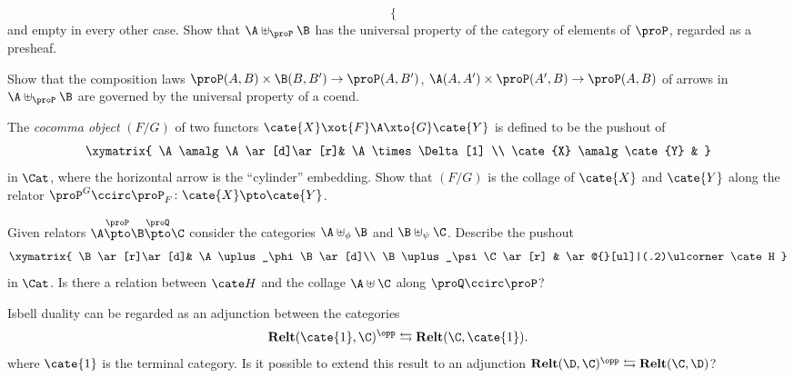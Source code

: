 \begin{exerciseset}
\begin{exercisepoints}
\[\begin{cases}
\end{cases}
\]
and empty in every other case. Show that $\A\uplus_\proP \B$ has the universal property of the category of elements of $\proP$, regarded as a presheaf.
\item Show that the composition laws $\proP(A,B)\times \B(B,B')\to \proP(A,B')$, $\A(A,A')\times \proP(A',B)\to \proP(A, B)$ of arrows in $\A\uplus_\proP \B$ are governed by the universal property of a coend.
\item The \emph{cocomma object} $(F/G)$ of two functors $\cate{X} \xot{F} \A \xto{G} \cate{Y}$ is defined to be the pushout of
\[
\xymatrix{
	\A \amalg \A \ar[d]\ar[r]& \A \times \Delta[1] \\
	\cate{X} \amalg \cate{Y} & 
}
\]
in $\Cat$, where the horizontal arrow is the ``cylinder'' embedding. Show that $(F/G)$ is the collage of $\cate{X}$ and $\cate{Y}$ along the relator $\proP^G \ccirc \proP_F \colon \cate{X} \pto \cate{Y}$.
\item Given relators $\A \overset{\proP}\pto \B \overset{\proQ}\pto \C$ consider the categories $\A\uplus_\phi\B$ and $\B\uplus_\psi\C$. Describe the pushout
\[
\xymatrix{
\B \ar[r]\ar[d]& \A\uplus_\phi\B \ar[d]\\
\B\uplus_\psi\C \ar[r] & \ar@{}[ul]|(.2)\ulcorner \cate H
}
\]
in $\Cat$. Is there a relation between $\cate H$ and the collage $\A \uplus \C$ along $\proQ\ccirc \proP$?
\item Isbell duality  can be regarded as an adjunction between the categories
\[
\Dist(\cate{1}, \C)^\opp \leftrightarrows \Dist(\C, \cate{1}).
\]
where $\cate{1}$ is the terminal category. Is it possible to extend this result to an adjunction $\Dist(\D, \C)^\opp \leftrightarrows \Dist(\C, \D)$?
\end{exercisepoints}
\end{exerciseset}